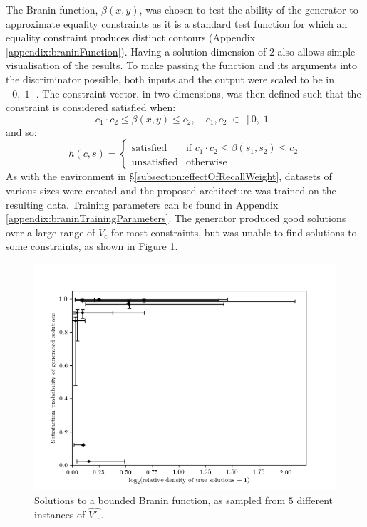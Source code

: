 \documentclass[../../main.tex]{subfiles}
\begin{document}
The Branin function, $\beta(x,y)$, was chosen to test the ability of the generator to approximate equality constraints as it is a standard test function for which an equality constraint produces distinct contours (Appendix \ref{appendix:braninFunction}).
Having a solution dimension of $2$ also allows simple visualisation of the results.
To make passing the function and its arguments into the discriminator possible, both inputs and the output were scaled to be in $[0,\;1]$.
The constraint vector, in two dimensions, was then defined such that the constraint is considered satisfied when:
\begin{equation}
    c_1\cdot c_2\le\beta(x,y)\le c_2,\quad c_1,c_2\;\in\;[0,\;1]
\end{equation}
and so:
\begin{equation}
    h(c,s)=\left\{\begin{array}{ll}\text{satisfied}&\mbox{if }c_1\cdot c_2\le\beta(s_1,s_2)\le c_2\\\text{unsatisfied}&\mbox{otherwise}\end{array}\right.
\end{equation}
As with the environment in \S\ref{subsection:effectOfRecallWeight}, datasets of various sizes were created and the proposed architecture was trained on the resulting data.
Training parameters can be found in Appendix \ref{appendix:braninTrainingParameters}.
The generator produced good solutions over a large range of $V_c$ for most constraints, but was unable to find solutions to some constraints, as shown in Figure \ref{fig:braninPropertiesW3}.
\begin{figure}[H]
    \begin{center}
    \includegraphics[width=\textwidth]{braninPropertiesW1}
    \caption{
        Solutions to a bounded Branin function, as sampled from $5$ different instances of $\hat{V'_c}$.
    }
    \label{fig:braninPropertiesW3}
    \end{center}
\end{figure}
\end{document}
